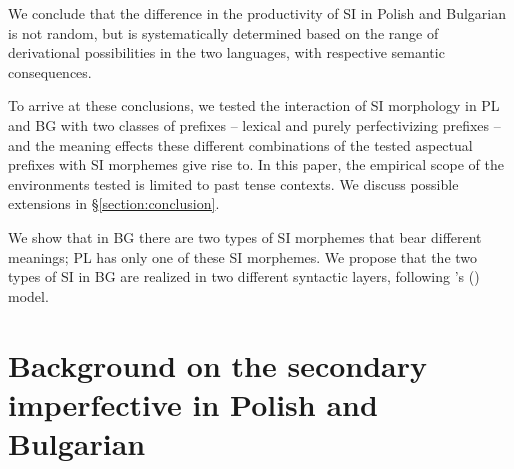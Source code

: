 \documentclass[output=paper,colorlinks,citecolor=brown]{langscibook}
\begin{document}
\noindent We conclude that the difference in the productivity of SI in Polish and Bulgarian is not random, but is systematically determined based on the range of derivational possibilities in the two languages, with respective semantic consequences. 

To arrive at these conclusions, we tested the interaction of SI morphology in PL and BG with two classes of prefixes -- lexical and purely perfectivizing prefixes -- and the meaning effects these different combinations of the tested aspectual prefixes with SI morphemes give rise to. In this paper, the empirical scope of the environments tested is limited to past tense contexts. We discuss possible extensions in \S \ref{section:conclusion}.

We show that in BG there are two types of SI morphemes that bear different meanings; PL has only one of these SI morphemes. We propose that the two types of SI in BG are realized in two different syntactic layers, following \citeauthor{cinque1999}'s (\citeyear{cinque1999}) model. 
 
 
 


\section{Background on the secondary imperfective in Polish and Bulgarian}\label{section:background-SI}
\end{document}
